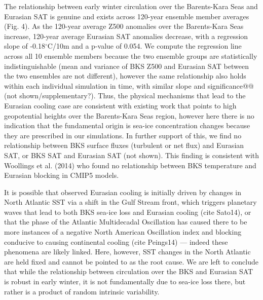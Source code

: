 \documentclass[grl]{AGUTeX}  %
\begin{document}
\begin{article}
The relationship between early winter circulation over the Barents-Kara Seas and Eurasian SAT is genuine and exists across 120-year ensemble member averages (Fig. 4). As the 120-year average Z500 anomalies over the Barents-Kara Seas increase, 120-year average Eurasian SAT anomalies decrease, with a regression slope of -0.18$^\circ$C/10m and a p-value of 0.054. We compute the regression line across all 10 ensemble members because the two ensemble groups are statistically indistinguishable (mean and variance of BKS Z500 and Eurasian SAT between the two ensembles are not different), however the same relationship also holds within each individual simulation in time, with similar slope and significance@@ (not shown/supplementary?). Thus, the physical mechanisms that lead to the Eurasian cooling case are consistent with existing work that points to high geopotential heights over the Barents-Kara Seas region, however here there is no indication that the fundamental origin is sea-ice concentration changes because they are prescribed in our simulations. In further support of this, we find no relationship between BKS surface fluxes (turbulent or net flux) and Eurasian SAT, or BKS SAT and Eurasian SAT (not shown). This finding is consistent with Woollings et al. (2014) who found no relationship between BKS temperature and Eurasian blocking in CMIP5 models.

It is possible that observed Eurasian cooling is initially driven by changes in North Atlantic SST via a shift in the Gulf Stream front, which triggers planetary waves that lead to both BKS sea-ice loss and Eurasian cooling (cite Sato14), or that the phase of the Atlantic Multidecadal Oscillation has caused there to be more instances of a negative North American Oscillation index and blocking conducive to causing continental cooling (cite Peings14) --- indeed these phenomena are likely linked. Here, however, SST changes in the North Atlantic are held fixed and cannot be pointed to as the root cause. We are left to conclude that while the relationship between circulation over the BKS and Eurasian SAT is robust in early winter, it is not fundamentally due to sea-ice loss there, but rather is a product of random intrinsic variability. 




\end{article}
\end{document}
